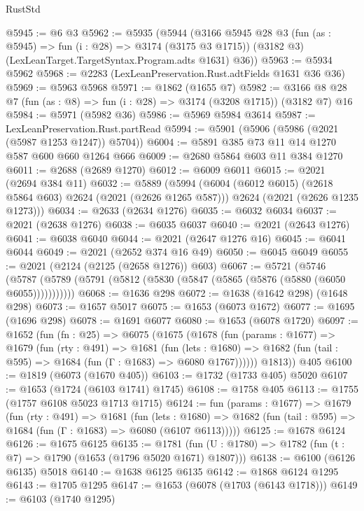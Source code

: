 \begin{lexlean}{RustStd}
\begin{coremodule}
{\begin{coremodule}
{{{{{{{{{{{{{{{{@5945 := @6 @3
@5962 := @5935
    (@5944
      (@3166
        @5945
        @28
        @3
        (fun (as : @5945) => fun (i : @28) => @3174 (@3175 @3 @1715))
        (@3182 @3)
        (LexLeanTarget.TargetSyntax.Program.adts @1631)
        @36))
@5963 := @5934 @5962
@5968 := @2283 (LexLeanPreservation.Rust.adtFields @1631 @36 @36)
@5969 := @5963 @5968
@5971 := @1862 (@1655 @7)
@5982 := @3166 @8 @28 @7 (fun (as : @8) => fun (i : @28) => @3174 (@3208 @1715)) (@3182 @7) @16
@5984 := @5971 (@5982 @36)
@5986 := @5969 @5984 @3614
@5987 := LexLeanPreservation.Rust.partRead
@5994 := @5901 (@5906 (@5986 (@2021 (@5987 @1253 @1247)) @5704))
@6004 := @5891 @385 @73 @11 @14 @1270 @587 @600 @660 @1264 @666
@6009 := @2680 @5864 @603 @11 @384 @1270
@6011 := @2688 (@2689 @1270)
@6012 := @6009 @6011
@6015 := @2021 (@2694 @384 @11)
@6032 := @5889
    (@5994
      (@6004 (@6012 @6015) (@2618 @5864 @603) @2624 (@2021 (@2626 @1265 @587)))
      @2624
      (@2021 (@2626 @1235 @1273)))
@6034 := @2633 (@2634 @1276)
@6035 := @6032 @6034
@6037 := @2021 (@2638 @1276)
@6038 := @6035 @6037
@6040 := @2021 (@2643 @1276)
@6041 := @6038 @6040
@6044 := @2021 (@2647 @1276 @16)
@6045 := @6041 @6044
@6049 := @2021 (@2652 @374 @16 @49)
@6050 := @6045 @6049
@6055 := @2021 (@2124 (@2125 (@2658 @1276)) @603)
@6067 := @5721
    (@5746 (@5787 (@5789 (@5791 (@5812 (@5830 (@5847 (@5865 (@5876 (@5880 (@6050 @6055)))))))))))
@6068 := @1636 @298
@6072 := @1638 (@1642 @298) (@1648 @298)
@6073 := @1657 @5017
@6075 := @1653 (@6073 @1672)
@6077 := @1695 (@1696 @298)
@6078 := @1691 @6077
@6080 := @1653 (@6078 @1720)
@6097 := @1652
    (fun (fn : @25) =>
    @6075
      (@1675
        (@1678
          (fun (params : @1677) =>
          @1679
            (fun (rty : @491) =>
            @1681
              (fun (lets : @1680) =>
              @1682 (fun (tail : @595) => @1684 (fun (Γ : @1683) => @6080 @1767))))))
        @1813))
    @405
@6100 := @1819 (@6073 (@1670 @405))
@6103 := @1732 (@1733 @405) @5020
@6107 := @1653 (@1724 (@6103 @1741) @1745)
@6108 := @1758 @405
@6113 := @1755 (@1757 @6108 @5023 @1713 @1715)
@6124 := fun (params : @1677) =>
  @1679
    (fun (rty : @491) =>
    @1681
      (fun (lets : @1680) =>
      @1682 (fun (tail : @595) => @1684 (fun (Γ : @1683) => @6080 (@6107 @6113)))))
@6125 := @1678 @6124
@6126 := @1675 @6125
@6135 := @1781 (fun (U : @1780) => @1782 (fun (t : @7) => @1790 (@1653 (@1796 @5020 @1671) @1807)))
@6138 := @6100 (@6126 @6135) @5018
@6140 := @1638 @6125 @6135
@6142 := @1868 @6124 @1295
@6143 := @1705 @1295
@6147 := @1653 (@6078 (@1703 (@6143 @1718)))
@6149 := @6103 (@1740 @1295)
}}}}}}}}}}}}}}}}
\end{coremodule}}
\end{coremodule}
\end{lexlean}
